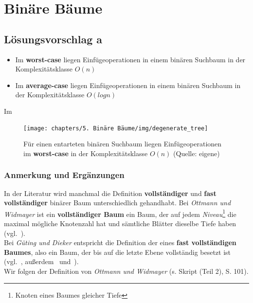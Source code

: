 \chapter{Binäre Bäume}

\section{Lösungsvorschlag a}

\begin{itemize}
    \item Im \textbf{worst-case} liegen Einfügeoperationen in einem binären Suchbaum in der Komplexitätsklasse $O(n)$
    \item Im \textbf{average-case} liegen Einfügeoperationen in einem binären Suchbaum in der Komplexitätsklasse $O(log n)$
\end{itemize}

Im \textbf{}


\begin{figure}
    \begin{center}
        \texttt{[image: chapters/5. Binäre Bäume/img/degenerate\_tree]}
        \caption{Für einen entarteten binären Suchbaum liegen Einfügeoperationen im \textbf{worst-case} in der Komplexitätsklasse $O(n)$ (Quelle: eigene)}
        \label{fig:degeneratetree}
    \end{center}
\end{figure}

\subsection{Anmerkung und Ergänzungen}


\noindent
In der Literatur wird manchmal die Definition \textbf{vollständiger} und \textbf{fast vollständiger} binärer Baum unterschiedlich gehandhabt.
Bei \textit{Ottmann und Widmayer} ist ein \textbf{vollständiger Baum} ein Baum, der auf jedem \textit{Niveau}\footnote{Knoten eines Baumes gleicher Tiefe} die maximal mögliche Knotenzahl hat und sämtliche Blätter dieselbe Tiefe haben (vgl.~\cite[261]{OW17e}).\\
Bei \textit{Güting und Dieker} entspricht die Definition der eines \textbf{fast vollständigen Baumes}, also ein Baum, der bis auf die letzte Ebene vollständig besetzt ist (vgl.~\cite[96]{GD18c}, außerdem~\cite[161]{CL22} und~\cite[401]{Knu97a}).\\
Wir folgen der Definition von \textit{Ottmann und Widmayer} (s. Skript (Teil 2), S.  101).\\

